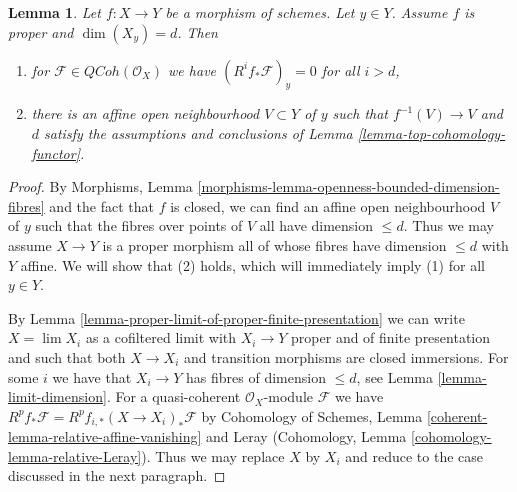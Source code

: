 \documentclass{stacks-project}
\theoremstyle{plain}
\newtheorem{lemma}[subsection]{Lemma}
\theoremstyle{definition}
\theoremstyle{remark}
\numberwithin{equation}{subsection}
\def\lim{\mathop{\mathrm{lim}}\nolimits}
\def\QCoh{\mathit{QCoh}}
\begin{document}
\begin{lemma}
\label{lemma-higher-direct-images-zero-above-dimension-fibre}
Let $f : X \to Y$ be a morphism of schemes. Let $y \in Y$.
Assume $f$ is proper and $\dim(X_y) = d$.
Then
\begin{enumerate}
\item for $\mathcal{F} \in \QCoh(\mathcal{O}_X)$
we have $(R^if_*\mathcal{F})_y = 0$ for all $i > d$,
\item there is an affine open neighbourhood $V \subset Y$
of $y$ such that $f^{-1}(V) \to V$ and $d$ satisfy the
assumptions and conclusions of Lemma \ref{lemma-top-cohomology-functor}.
\end{enumerate}
\end{lemma}

\begin{proof}
By Morphisms, Lemma
\ref{morphisms-lemma-openness-bounded-dimension-fibres}
and the fact that $f$ is closed, we can find an affine open neighbourhood
$V$ of $y$ such that the fibres over points of $V$ all have dimension
$\leq d$. Thus we may assume $X \to Y$ is a proper morphism all
of whose fibres have dimension $\leq d$ with $Y$ affine.
We will show that (2) holds, which will immediately imply (1)
for all $y \in Y$.

\medskip\noindent
By Lemma \ref{lemma-proper-limit-of-proper-finite-presentation}
we can write $X = \lim X_i$ as a cofiltered limit with $X_i \to Y$ proper
and of finite presentation and such that both $X \to X_i$
and transition morphisms are closed immersions.
For some $i$ we have that $X_i \to Y$ has fibres of dimension $\leq d$,
see Lemma \ref{lemma-limit-dimension}.
For a quasi-coherent $\mathcal{O}_X$-module $\mathcal{F}$ we have
$R^pf_*\mathcal{F} = R^pf_{i, *}(X \to X_i)_*\mathcal{F}$ by
Cohomology of Schemes, Lemma \ref{coherent-lemma-relative-affine-vanishing}
and Leray (Cohomology, Lemma \ref{cohomology-lemma-relative-Leray}).
Thus we may replace $X$ by $X_i$ and
reduce to the case discussed in the next paragraph.


\end{proof}
\end{document}
